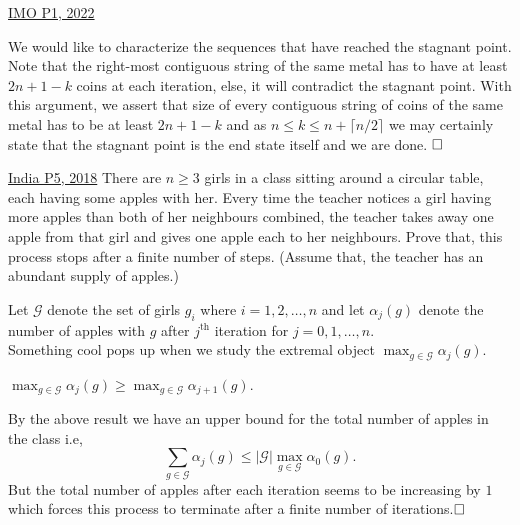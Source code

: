 \begin{problem}{3}{\href{https://artofproblemsolving.com/community/q1h2883211p34203276}{IMO P1, 2022}}
\begin{solution}
	\indent We would like to characterize the sequences that have reached the stagnant point. Note that the right-most contiguous string of the same metal has to have at least $2n+1-k$ coins at each iteration, else, it will contradict the stagnant point. With this argument, we assert that size of every contiguous string of coins of the same metal has to be at least $2n+1-k$ and as $n\le k\le n+\lceil n/2\rceil$ we may certainly state that the stagnant point is the end state itself and we are done. $\qedwhite$
	\end{solution}
\end{problem}
	
\begin{problem}{4}{\href{https://artofproblemsolving.com/community/q1h1578516p32946994}{India P5, 2018}}
	There are $n\ge 3$ girls in a class sitting around a circular table, each having some apples with her. Every time the teacher notices a girl having more apples than both of her neighbours combined, the teacher takes away one apple from that girl and gives one apple each to her neighbours. Prove that, this process stops after a finite number of steps. (Assume that, the teacher has an abundant supply of apples.)
	\begin{solution}Let $\mathcal{G}$ denote the set of girls $g_i$ where $i=1,2,\ldots,n $ and let $\alpha_j(g)$ denote the number of apples with $g$ after $j^{\text{th}}$ iteration for $j=0,1,\ldots,n$.\\
	Something cool pops up when we study the extremal object $\displaystyle\max_{g\in\mathcal{G}}\alpha_j{(g)}$.

	\begin{lemma}{1} 
		$\displaystyle\max_{g\in\mathcal{G}}\alpha_{j}{(g)}\ge \displaystyle\max_{g\in\mathcal{G}}\alpha_{j+1}{(g)}$.
	\end{lemma}
	By the above result we have an upper bound for the total number of apples in the class i.e,
$$\sum_{g\in\mathcal{G}}\alpha_{j}(g)\le |\mathcal{G}|\max_{g\in\mathcal{G}}\alpha_{0}{(g)}.$$But the total number of apples after each iteration seems to be increasing by $1$ which forces this process to terminate after a finite number of iterations.$\qedwhite$
	\end{solution}
\end{problem}
